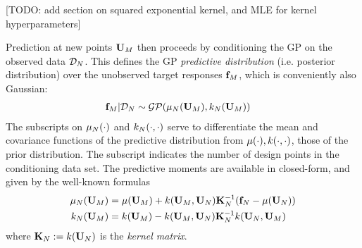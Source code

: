 \documentclass[12pt]{article}
\begin{document}
[TODO: add section on squared exponential kernel, and MLE for kernel hyperparameters]

Prediction at new points $\designMat[M]$ then proceeds by conditioning the GP on the observed data $\designData_{\Ndesign}$. This defines the 
GP \textit{predictive distribution} (i.e. posterior distribution) over the unobserved target responses $\fObs[M]$, which is conveniently also Gaussian:
\begin{align}
\fObs[M] | \designData_{\Ndesign} &\sim \GP(\GPMeanPred[\Ndesign](\designMat[M]), \GPKerPred[\Ndesign](\designMat[M]))
\end{align}
The subscripts on $\GPMeanPred[\Ndesign](\cdot)$ and $\GPKerPred[\Ndesign](\cdot, \cdot)$ serve to differentiate the mean and covariance functions of the predictive 
distribution from $\GPMean(\cdot), \GPKer(\cdot, \cdot)$, those of the prior distribution. The subscript indicates the number of design points in the conditioning data set. 
The predictive moments are available in closed-form, and given by the well-known formulas 
\begin{align}
\GPMeanPred[\Ndesign](\designMat[M]) &= \GPMean(\designMat[M]) + \GPKer(\designMat[M], \designMat[\Ndesign]) \KerMat[\Ndesign]^{-1}(\fObs[\Ndesign] - \GPMean(\designMat[\Ndesign])) \label{kriging_eqns} \\
\GPKerPred[\Ndesign](\designMat[M]) &= \GPKer(\designMat[M]) - \GPKer(\designMat[M], \designMat[\Ndesign]) \KerMat[\Ndesign]^{-1} \GPKer(\designMat[\Ndesign], \designMat[M]) 
\end{align}
where $\KerMat[\Ndesign] := \GPKer(\designMat[\Ndesign])$ is the \textit{kernel matrix}.
\end{document}
